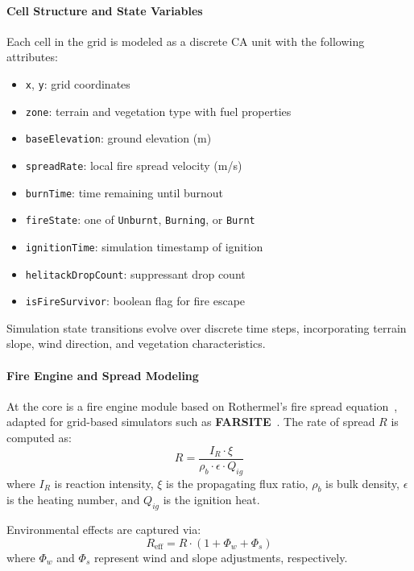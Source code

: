 \documentclass[conference]{IEEEtran}
\begin{document}
\paragraph{Cell Structure and State Variables}
Each cell in the grid is modeled as a discrete CA unit with the following attributes:
\begin{itemize}
    \item \texttt{x}, \texttt{y}: grid coordinates
    \item \texttt{zone}: terrain and vegetation type with fuel properties
    \item \texttt{baseElevation}: ground elevation (m)
    \item \texttt{spreadRate}: local fire spread velocity (m/s)
    \item \texttt{burnTime}: time remaining until burnout
    \item \texttt{fireState}: one of \texttt{Unburnt}, \texttt{Burning}, or \texttt{Burnt}
    \item \texttt{ignitionTime}: simulation timestamp of ignition
    \item \texttt{helitackDropCount}: suppressant drop count
    \item \texttt{isFireSurvivor}: boolean flag for fire escape
\end{itemize}
Simulation state transitions evolve over discrete time steps, incorporating terrain slope, wind direction, and vegetation characteristics.

\paragraph{Fire Engine and Spread Modeling}
At the core is a fire engine module based on Rothermel’s fire spread equation~\cite{rothermel_fire_spread_eq}, adapted for grid-based simulators such as \textbf{FARSITE}~\cite{finney2004farsite}. The rate of spread $R$ is computed as:
\begin{equation}
R = \frac{I_R \cdot \xi}{\rho_b \cdot \epsilon \cdot Q_{ig}}
\end{equation}
where $I_R$ is reaction intensity, $\xi$ is the propagating flux ratio, $\rho_b$ is bulk density, $\epsilon$ is the heating number, and $Q_{ig}$ is the ignition heat.

Environmental effects are captured via:
\begin{equation}
R_{\text{eff}} = R \cdot (1 + \Phi_w + \Phi_s)
\end{equation}
where $\Phi_w$ and $\Phi_s$ represent wind and slope adjustments, respectively.
\end{document}
